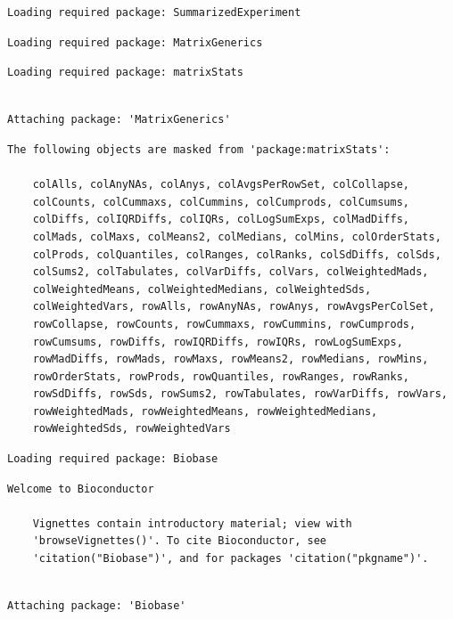 \documentclass[
  letterpaper,
  DIV=11,
  numbers=noendperiod]{scrartcl}
\begin{document}
\begin{verbatim}
Loading required package: SummarizedExperiment
\end{verbatim}

\begin{verbatim}
Loading required package: MatrixGenerics
\end{verbatim}

\begin{verbatim}
Loading required package: matrixStats
\end{verbatim}

\begin{verbatim}

Attaching package: 'MatrixGenerics'
\end{verbatim}

\begin{verbatim}
The following objects are masked from 'package:matrixStats':

    colAlls, colAnyNAs, colAnys, colAvgsPerRowSet, colCollapse,
    colCounts, colCummaxs, colCummins, colCumprods, colCumsums,
    colDiffs, colIQRDiffs, colIQRs, colLogSumExps, colMadDiffs,
    colMads, colMaxs, colMeans2, colMedians, colMins, colOrderStats,
    colProds, colQuantiles, colRanges, colRanks, colSdDiffs, colSds,
    colSums2, colTabulates, colVarDiffs, colVars, colWeightedMads,
    colWeightedMeans, colWeightedMedians, colWeightedSds,
    colWeightedVars, rowAlls, rowAnyNAs, rowAnys, rowAvgsPerColSet,
    rowCollapse, rowCounts, rowCummaxs, rowCummins, rowCumprods,
    rowCumsums, rowDiffs, rowIQRDiffs, rowIQRs, rowLogSumExps,
    rowMadDiffs, rowMads, rowMaxs, rowMeans2, rowMedians, rowMins,
    rowOrderStats, rowProds, rowQuantiles, rowRanges, rowRanks,
    rowSdDiffs, rowSds, rowSums2, rowTabulates, rowVarDiffs, rowVars,
    rowWeightedMads, rowWeightedMeans, rowWeightedMedians,
    rowWeightedSds, rowWeightedVars
\end{verbatim}

\begin{verbatim}
Loading required package: Biobase
\end{verbatim}

\begin{verbatim}
Welcome to Bioconductor

    Vignettes contain introductory material; view with
    'browseVignettes()'. To cite Bioconductor, see
    'citation("Biobase")', and for packages 'citation("pkgname")'.
\end{verbatim}

\begin{verbatim}

Attaching package: 'Biobase'
\end{verbatim}
\end{document}
